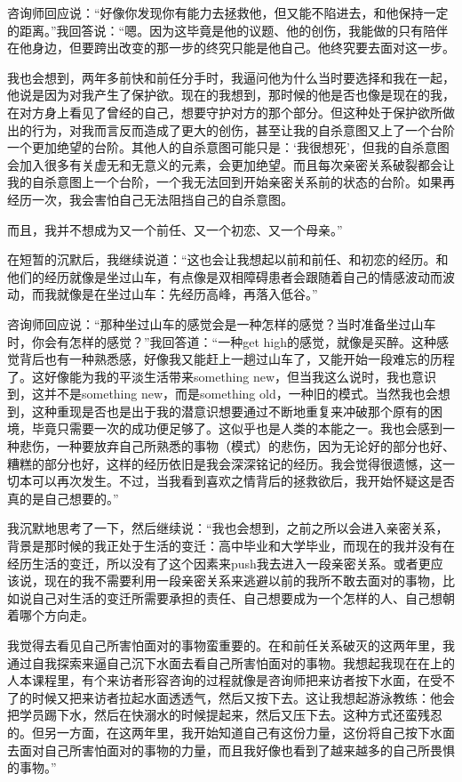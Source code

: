 咨询师回应说：“好像你发现你有能力去拯救他，但又能不陷进去，和他保持一定的距离。”我回答说：“嗯。因为这毕竟是他的议题、他的创伤，我能做的只有陪伴在他身边，但要跨出改变的那一步的终究只能是他自己。他终究要去面对这一步。

我也会想到，两年多前快和前任分手时，我逼问他为什么当时要选择和我在一起，他说是因为对我产生了保护欲。现在的我想到，那时候的他是否也像是现在的我，在对方身上看见了曾经的自己，想要守护对方的那个部分。但这种处于保护欲所做出的行为，对我而言反而造成了更大的创伤，甚至让我的自杀意图又上了一个台阶\pozhehao{}一个更加绝望的台阶。其他人的自杀意图可能只是：‘我很想死’，但我的自杀意图会加入很多有关虚无和无意义的元素，会更加绝望。而且每次亲密关系破裂都会让我的自杀意图上一个台阶，一个我无法回到开始亲密关系前的状态的台阶。如果再经历一次，我会害怕自己无法阻挡自己的自杀意图。

而且，我并不想成为又一个前任、又一个初恋、又一个母亲。”

\tristarsepline

在短暂的沉默后，我继续说道：“这也会让我想起以前和前任、和初恋的经历。和他们的经历就像是坐过山车，有点像是双相障碍患者会跟随着自己的情感波动而波动，而我就像是在坐过山车：先经历高峰，再落入低谷。”

咨询师回应说：“那种坐过山车的感觉会是一种怎样的感觉？当时准备坐过山车时，你会有怎样的感觉？”我回答道：“一种get high的感觉，就像是买醉。这种感觉背后也有一种熟悉感，好像我又能赶上一趟过山车了，又能开始一段难忘的历程了。这好像能为我的平淡生活带来something new，但当我这么说时，我也意识到，这并不是something new，而是something old，一种旧的模式。当然我也会想到，这种重现是否也是出于我的潜意识想要通过不断地重复来冲破那个原有的困境，毕竟只需要一次的成功便足够了。这似乎也是人类的本能之一。我也会感到一种悲伤，一种要放弃自己所熟悉的事物（模式）的悲伤，因为无论好的部分也好、糟糕的部分也好，这样的经历依旧是我会深深铭记的经历。我会觉得很遗憾，这一切本可以再次发生。不过，当我看到喜欢之情背后的拯救欲后，我开始怀疑这是否真的是自己想要的。”

我沉默地思考了一下，然后继续说：“我也会想到，之前之所以会进入亲密关系，背景是那时候的我正处于生活的变迁：高中毕业和大学毕业，而现在的我并没有在经历生活的变迁，所以没有了这个因素来push我去进入一段亲密关系。或者更应该说，现在的我不需要利用一段亲密关系来逃避以前的我所不敢去面对的事物，比如说自己对生活的变迁所需要承担的责任、自己想要成为一个怎样的人、自己想朝着哪个方向走。

\tristarsepline

我觉得去看见自己所害怕面对的事物蛮重要的。在和前任关系破灭的这两年里，我通过自我探索来逼自己沉下水面去看自己所害怕面对的事物。我想起我现在在上的人本课程里，有个来访者形容咨询的过程就像是咨询师把来访者按下水面，在受不了的时候又把来访者拉起水面透透气，然后又按下去。这让我想起游泳教练：他会把学员踢下水，然后在快溺水的时候提起来，然后又压下去。这种方式还蛮残忍的。但另一方面，在这两年里，我开始知道自己有这份力量，这份将自己按下水面去面对自己所害怕面对的事物的力量，而且我好像也看到了越来越多的自己所畏惧的事物。”

